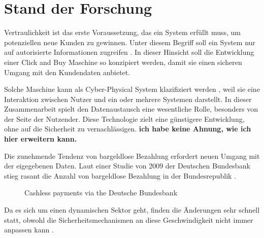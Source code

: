 \section{Stand der Forschung}

Vertraulichkeit ist das erste Voraussetzung, das ein System erfüllt muss, um  potenziellen neue 
Kunden zu gewinnen. Unter diesem Begriff soll ein System nur auf autorisierte Informationen 
zugreifen \cite{refbook:SWIS}. In dieser Hinsicht soll die Entwicklung einer Click and Buy Maschine 
so konzipiert werden, damit sie einen sicheren Umgang mit den Kundendaten anbietet.


Solche Maschine kann als Cyber-Physical System klazifiziert werden \cite{inbook:MHNS}, weil sie 
eine Interaktion zwischen Nutzer und ein oder mehrere Systemen darstellt. In dieser Zusammenarbeit
spielt den Datenaustausch eine wesentliche Rolle, besonders von der Seite der Nutzender. 
Diese Technologie zielt eine günstigere Entwicklung, ohne auf die Sicherheit zu vernachlässigen.
\textbf{ich habe keine Ahnung, wie ich hier erweitern kann.}


Die zunehmende Tendenz von bargeldlose Bezahlung erfordert neuen Umgang mit der eigegebenen Daten.
Laut einer Studie von 2009 der Deutschen Bundesbank stieg rasant die Anzahl von bargeldlose Bezahlung 
in der Bundesrepublik \cite{refrep:DB}.

\begin{figure}[htb]
    \caption{Cashless payments via the Deutsche Bundesbank}
    \label{fig:graphic}
\end{figure}

Da es sich um einen dynamischen Sektor geht, finden die Änderungen sehr schnell statt, obwohl die 
Sicherheitsmechanismen an diese Geschwindigkeit nicht immer anpassen kann \cite{refbook:MNIT}.









